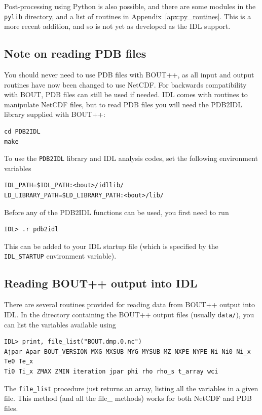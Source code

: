 \documentclass[12pt]{article}
\newcommand{\code}[1]{\texttt{#1}}
\begin{document}
Post-processing using Python is also possible, and there are some modules in
the \texttt{pylib} directory, and a list of routines in
Appendix~\ref{apx:py_routines}.  This is a more recent addition, and so is not
yet as developed as the IDL support.



\subsection{Note on reading PDB files}
%
You should never need to use PDB files with BOUT++, as all input and output
routines have now been changed to use NetCDF. For backwards compatibility with
BOUT, PDB files can still be used if needed. IDL comes with routines to
manipulate NetCDF files, but to read PDB files you will need the PDB2IDL
library supplied with BOUT++:
%
\begin{verbatim}
cd PDB2IDL
make
\end{verbatim}
%
To use the \code{PDB2IDL} library and IDL analysis codes, set the following
environment variables
%
\begin{verbatim}
IDL_PATH=$IDL_PATH:<bout>/idllib/
LD_LIBRARY_PATH=$LD_LIBRARY_PATH:<bout>/lib/
\end{verbatim}
%
Before any of the PDB2IDL functions can be used, you first need to run
%
\begin{verbatim}
IDL> .r pdb2idl
\end{verbatim}
%
This can be added to your IDL startup file (which is specified by the
\code{IDL\_STARTUP} environment variable).



\subsection{Reading BOUT++ output into IDL}
%
%
There are several routines provided for reading data from BOUT++ output into
IDL. In the directory containing the BOUT++ output files (usually
\texttt{data/}), you can list the variables available using
%
\begin{verbatim}
IDL> print, file_list("BOUT.dmp.0.nc")
Ajpar Apar BOUT_VERSION MXG MXSUB MYG MYSUB MZ NXPE NYPE Ni Ni0 Ni_x Te0 Te_x
Ti0 Ti_x ZMAX ZMIN iteration jpar phi rho rho_s t_array wci
\end{verbatim}
%
The \code{file\_list} procedure just returns an array, listing all the
variables in a given file. This method (and all the file\_ methods) works for
both NetCDF and PDB files.
\end{document}
